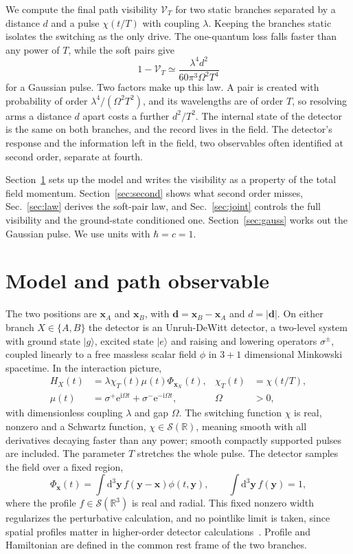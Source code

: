 \documentclass[11pt,a4paper]{article}
\newcommand{\dd}{\mathrm{d}}
\newcommand{\ii}{\mathrm{i}}
\newcommand{\ee}{\mathrm{e}}
\newcommand{\ket}[1]{\lvert #1\rangle}
\newcommand{\cS}{\mathcal{S}}
\newcommand{\cV}{\mathcal{V}}
\begin{document}
We compute the final path visibility $\cV_T$ for two static branches separated by a distance $d$ and a pulse $\chi(t/T)$ with coupling $\lambda$. Keeping the branches static isolates the switching as the only drive. The one-quantum loss falls faster than any power of $T$, while the soft pairs give
\begin{equation*}
 1-\cV_T\simeq\frac{\lambda^4d^2}{60\pi^3\Omega^2T^4}
\end{equation*}
for a Gaussian pulse. Two factors make up this law. A pair is created with probability of order $\lambda^4/(\Omega^2T^2)$, and its wavelengths are of order $T$, so resolving arms a distance $d$ apart costs a further $d^2/T^2$. The internal state of the detector is the same on both branches, and the record lives in the field. The detector's response and the information left in the field, two observables often identified at second order, separate at fourth.

Section~\ref{sec:model} sets up the model and writes the visibility as a property of the total field momentum. Section~\ref{sec:second} shows what second order misses, Sec.~\ref{sec:law} derives the soft-pair law, and Sec.~\ref{sec:joint} controls the full visibility and the ground-state conditioned one. Section~\ref{sec:gauss} works out the Gaussian pulse. We use units with $\hbar=c=1$.

\section{Model and path observable}
\label{sec:model}

The two positions are $\bm x_A$ and $\bm x_B$, with $\bm d=\bm x_B-\bm x_A$ and $d=|\bm d|$. On either branch $X\in\{A,B\}$ the detector is an Unruh-DeWitt detector, a two-level system with ground state $\ket g$, excited state $\ket e$ and raising and lowering operators $\sigma^\pm$, coupled linearly to a free massless scalar field $\phi$ in $3+1$ dimensional Minkowski spacetime. In the interaction picture,
\begin{align}
 H_X(t)&=\lambda\chi_T(t)\mu(t)\Phi_{\bm x_X}(t),
 &\chi_T(t)&=\chi(t/T),\label{eq:H}\\
 \mu(t)&=\sigma^+\ee^{\ii\Omega t}+\sigma^-\ee^{-\ii\Omega t},
 &\Omega&>0,\nonumber
\end{align}
with dimensionless coupling $\lambda$ and gap $\Omega$. The switching function $\chi$ is real, nonzero and a Schwartz function, $\chi\in\cS(\mathbb R)$, meaning smooth with all derivatives decaying faster than any power; smooth compactly supported pulses are included. The parameter $T$ stretches the whole pulse. The detector samples the field over a fixed region,
\begin{equation}
 \Phi_{\bm x}(t)=\int\dd^3\bm y\,f(\bm y-\bm x)\phi(t,\bm y),
 \qquad \int\dd^3\bm y\,f(\bm y)=1,\label{eq:smear}
\end{equation}
where the profile $f\in\cS(\mathbb R^3)$ is real and radial. This fixed nonzero width regularizes the perturbative calculation, and no pointlike limit is taken, since spatial profiles matter in higher-order detector calculations~\cite{Hummer2016}. Profile and Hamiltonian are defined in the common rest frame of the two branches.
\end{document}
